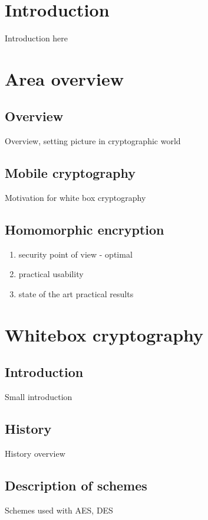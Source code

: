 \documentclass[11pt,oneside,final]{fithesis2}
\begin{document}
\chapter{Introduction}
Introduction here

\chapter{Area overview}\label{sec:theory}
    
    \section{Overview}
    Overview, setting picture in cryptographic world

    \section{Mobile cryptography}
    Motivation for white box cryptography

    \section{Homomorphic encryption}
    \begin{enumerate}
     \item security point of view - optimal
     \item practical usability
     \item state of the art practical results
    \end{enumerate}

\chapter{Whitebox cryptography}
    
    \section{Introduction}
    Small introduction
    
    \section{History}
    History overview

    \section{Description of schemes}
    Schemes used with AES, DES
\end{document}
